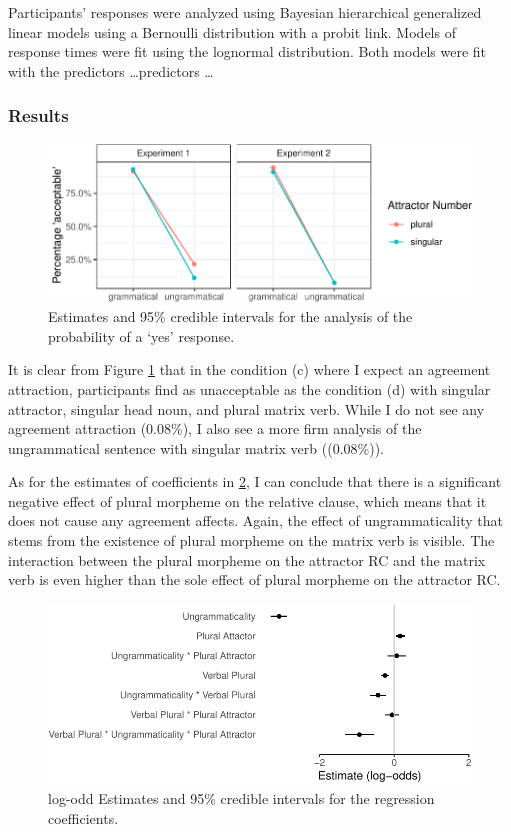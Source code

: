 \documentclass[doc]{apa6}
\begin{document}
Participants' responses were analyzed using Bayesian hierarchical generalized linear models using a Bernoulli distribution with a probit link. Models of response times were fit using the lognormal distribution. Both models were fit with the predictors
\ldots predictors \ldots

\hypertarget{results-1}{%
\subsubsection{Results}\label{results-1}}

\begin{figure}
\centering
\includegraphics{paper_draft_files/figure-latex/exp2AvgResponse-1.pdf}
\caption{\label{fig:exp2AvgResponse}Estimates and 95\% credible intervals for the analysis of the probability of a `yes' response.}
\end{figure}

It is clear from Figure \ref{fig:exp2AvgResponse} that in the condition (c) where I expect an agreement attraction, participants find as unacceptable as the condition (d) with singular attractor, singular head noun, and plural matrix verb. While I do not see any agreement attraction (0.08\%), I also see a more firm analysis of the ungrammatical sentence with singular matrix verb ((0.08\%)).

As for the estimates of coefficients in \ref{fig:exp2ResponseModelPlot}, I can conclude that there is a significant negative effect of plural morpheme on the relative clause, which means that it does not cause any agreement affects. Again, the effect of ungrammaticality that stems from the existence of plural morpheme on the matrix verb is visible. The interaction between the plural morpheme on the attractor RC and the matrix verb is even higher than the sole effect of plural morpheme on the attractor RC.

\begin{figure}
\centering
\includegraphics{paper_draft_files/figure-latex/exp2ResponseModelPlot-1.pdf}
\caption{\label{fig:exp2ResponseModelPlot}log-odd Estimates and 95\% credible intervals for the regression coefficients.}
\end{figure}
\end{document}
